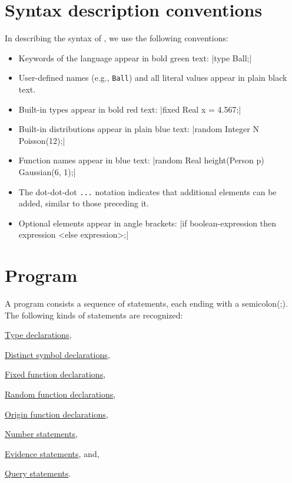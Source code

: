 \documentclass[12pt]{article}
\begin{document}
\section{Syntax description conventions}\label{convention-section}
In describing the syntax of \bl, we use the following conventions:
\begin{itemize}
\item Keywords of the language appear in bold green text: \blog|type Ball;|
\item User-defined names (e.g., {\tt Ball}) and all literal values appear in plain black text.
\item Built-in types appear in bold red text: \blog|fixed Real x = 4.567;|
\item Built-in distributions appear in plain blue text: \blog|random Integer N ~ Poisson(12);|
\item Function names appear in blue text: \blog|random Real height(Person p) ~ Gaussian(6, 1);|
\item The dot-dot-dot \verb|...| notation indicates that additional elements can be added, similar to those preceding it.
\item Optional elements appear in angle brackets: \blog|if boolean-expression then expression <else expression>;|
\end{itemize}

\section{\bl Program}\label{program-section}
A \bl program consists a sequence of statements, each ending with a semicolon(;). 
The following kinds of statements are recognized:
\begin{enumerate*}
\item \hyperref[type-declaration-section]{Type declarations}, 
\item \hyperref[distinct-section]{Distinct symbol declarations}, 
\item \hyperref[fixed-section]{Fixed function declarations},
\item \hyperref[random-function-section]{Random function declarations},
\item \hyperref[origin-section]{Origin function declarations},
\item \hyperref[number-section]{Number statements},
\item \hyperref[evidence-section]{Evidence statements}, and,
\item \hyperref[query-section]{Query statements}.
\end{enumerate*}
\end{document}
